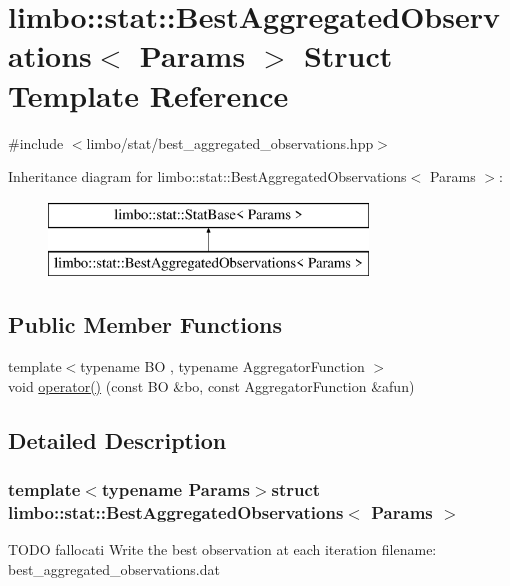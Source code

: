 \hypertarget{structlimbo_1_1stat_1_1_best_aggregated_observations}{}\section{limbo\+:\+:stat\+:\+:Best\+Aggregated\+Observations$<$ Params $>$ Struct Template Reference}
\label{structlimbo_1_1stat_1_1_best_aggregated_observations}


{\ttfamily \#include $<$limbo/stat/best\+\_\+aggregated\+\_\+observations.\+hpp$>$}

Inheritance diagram for limbo\+:\+:stat\+:\+:Best\+Aggregated\+Observations$<$ Params $>$\+:\begin{figure}[H]
\begin{center}
\leavevmode
\includegraphics[height=2.000000cm]{structlimbo_1_1stat_1_1_best_aggregated_observations}
\end{center}
\end{figure}
\subsection*{Public Member Functions}
\begin{DoxyCompactItemize}
\item 
{\footnotesize template$<$typename B\+O , typename Aggregator\+Function $>$ }\\void \hyperlink{structlimbo_1_1stat_1_1_best_aggregated_observations_a37ad22cd25f49bbec5109a6f1367057e}{operator()} (const B\+O \&bo, const Aggregator\+Function \&afun)
\end{DoxyCompactItemize}


\subsection{Detailed Description}
\subsubsection*{template$<$typename Params$>$struct limbo\+::stat\+::\+Best\+Aggregated\+Observations$<$ Params $>$}

T\+O\+D\+O fallocati Write the best observation at each iteration filename\+: {\ttfamily best\+\_\+aggregated\+\_\+observations.\+dat} 

